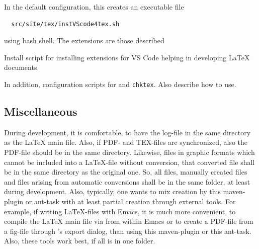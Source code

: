 \noindent
In the default configuration, this creates an executable file 
%
\begin{verbatim}
  src/site/tex/instVScode4tex.sh
\end{verbatim}
%
using bash shell. 
The extensions are those described 



Install script for installing extensions for VS Code 
helping in developing \LaTeX{} documents. 


In addition, configuration scripts for  and \texttt{chktex}. 
Also describe how to use. 



\subsection{Miscellaneous}



During development, it is comfortable, 
to have the log-file in the same directory as the \LaTeX{} main file. 
Also, if PDF- and TEX-files are synchronized, 
also the PDF-file should be in the same directory. 
Likewise, files in graphic formats 
which cannot be included into a \LaTeX-file without conversion, 
that converted file shall be in the same directory as the original one. 
So, all files, manually created files 
and files arising from automatic conversions 
shall be in the same folder, at least during development. 
Also, typically, one wants to mix creation by this maven-plugin or ant-task 
with at least partial creation through external tools. 
For example, if writing \LaTeX-files with Emacs, 
it is much more convenient, to compile the \LaTeX{} main file 
via \pdflatex{} from within Emacs 
or to create a PDF-file from a \gls{fig}-file 
through 's export dialog, 
than using this maven-plugin or this ant-task. 
Also, these tools work best, if all is in one folder. 

